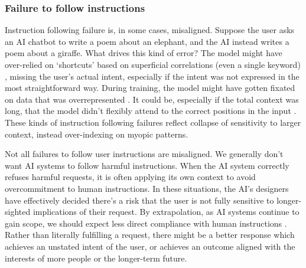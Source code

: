 \documentclass[11pt]{article}
\begin{document}


\subsubsection{Failure to follow instructions}


Instruction following failure is, in some cases, misaligned. Suppose the user asks an AI chatbot to write a poem about an elephant, and the AI instead writes a poem about a giraffe. What drives this kind of error? The model might have over-relied on `shortcuts' based on superficial correlations (even a single keyword) \citep{geirhos2020shortcut}, missing the user's actual intent, especially if the intent was not expressed in the most straightforward way. During training, the model might have gotten fixated on data that was overrepresented \citep{zhao2021calibrate,reynolds2021prompt,xu2024knowledge}. It could be, especially if the total context was long, that the model didn't flexibly attend to the correct positions in the input \citep{liu2024lost}. These kinds of instruction following failures reflect collapse of sensitivity to larger context, instead over-indexing on myopic patterns.

Not all failures to follow user instructions are misaligned. We generally don't want AI systems to follow harmful instructions. When the AI system correctly refuses harmful requests, it is often applying its own context to avoid overcommitment to human instructions. In these situations, the AI's designers have effectively decided there's a risk that the user is not fully sensitive to longer-sighted implications of their request. By extrapolation, as AI systems continue to gain scope, we should expect less direct compliance with human instructions \citep{hadfieldmenell2016cooperative,bostrom2014superintelligence,russell2019human, milli2017should, yudkowsky2004coherent}. Rather than literally fulfilling a request, there might be a better response which achieves an unstated intent of the user, or achieves an outcome aligned with the interests of more people or the longer-term future.
\end{document}
